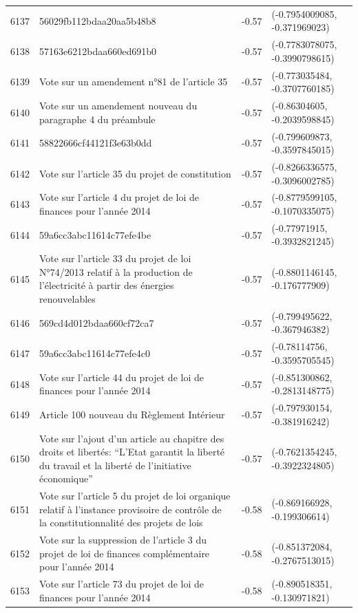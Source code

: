 \begin{table}[ht]
\begin{tabular}{rlrl}
  6137 & 56029fb112bdaa20aa5b48b8 & -0.57 & (-0.7954009085, -0.371969023) \\ 
  6138 & 57163e6212bdaa660ed691b0 & -0.57 & (-0.7783078075, -0.3990798615) \\ 
  6139 & Vote sur un amendement n°81 de l'article 35 & -0.57 & (-0.773035484, -0.3707760185) \\ 
  6140 & Vote sur un amendement nouveau du paragraphe 4 du préambule & -0.57 & (-0.86304605, -0.2039598845) \\ 
  6141 & 58822666cf44121f3e63b0dd & -0.57 & (-0.799609873, -0.3597845015) \\ 
  6142 & Vote sur l'article 35 du projet de constitution & -0.57 & (-0.8266336575, -0.3096002785) \\ 
  6143 & Vote sur l'article 4 du projet de loi de finances pour l'année 2014 & -0.57 & (-0.8779599105, -0.1070335075) \\ 
  6144 & 59a6cc3abc11614c77efe4be & -0.57 & (-0.77971915, -0.3932821245) \\ 
  6145 & Vote sur l'article 33 du projet de loi N°74/2013 relatif à la production de l'électricité à partir des énergies renouvelables & -0.57 & (-0.8801146145, -0.176777909) \\ 
  6146 & 569cd4d012bdaa660cf72ca7 & -0.57 & (-0.799495622, -0.367946382) \\ 
  6147 & 59a6cc3abc11614c77efe4c0 & -0.57 & (-0.78114756, -0.3595705545) \\ 
  6148 & Vote sur l'article 44 du projet de loi de finances pour l'année 2014 & -0.57 & (-0.851300862, -0.2813148775) \\ 
  6149 & Article 100 nouveau du Règlement Intérieur & -0.57 & (-0.797930154, -0.381916242) \\ 
  6150 & Vote sur l'ajout d'un article au chapitre des droits et libertés: “L’Etat garantit la liberté du travail et la liberté de l’initiative économique” & -0.57 & (-0.7621354245, -0.3922324805) \\ 
  6151 & Vote sur l'article 5 du projet de loi organique relatif à l'instance provisoire de contrôle de la constitutionnalité des projets de lois & -0.58 & (-0.869166928, -0.199306614) \\ 
  6152 & Vote sur la suppression de l'article 3 du projet de loi de finances complémentaire pour l'année 2014 & -0.58 & (-0.851372084, -0.2767513015) \\ 
  6153 & Vote sur l'article 73 du projet de loi de finances pour l'année 2014 & -0.58 & (-0.890518351, -0.130971821) \\ 

\end{tabular}
\end{table}
